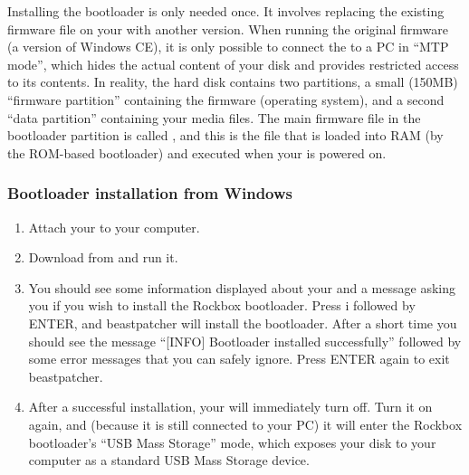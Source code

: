 

Installing the bootloader is only needed once. It involves replacing the
existing firmware file on your \dap{} with another version.
When running the original \playerman{} firmware (a version of Windows CE), it is
only possible to connect the \dap{} to a PC in ``MTP mode'', which hides
the actual content of your \daps{} disk and provides restricted access
to its contents.
In reality, the \daps{} hard disk contains two partitions, a small
(150MB) ``firmware partition'' containing the \daps{} firmware (operating
system), and a second ``data partition'' containing your media files. The main
firmware file in the bootloader partition is called , and
this is the file that is loaded into RAM (by the \daps{} ROM-based
bootloader) and executed when your \dap{} is powered on.

\subsubsection{Bootloader installation from Windows}

\begin{enumerate}

\item Attach your \dap{} to your computer.

\item Download  from
and run it.

\item You should see some information displayed about
your \dap{} and a message asking you if you wish to install the Rockbox
bootloader. Press i followed by ENTER, and beastpatcher will
install the bootloader. After a short time you should see the message
``[INFO] Bootloader installed successfully'' followed by some error
messages that you can safely ignore. Press ENTER again to exit
beastpatcher.

\item After a successful installation, your \dap{} will immediately turn off.
Turn it on again, and (because it is still connected to your PC)
it will enter the Rockbox bootloader's
``USB Mass Storage'' mode, which exposes your \daps{} disk to your computer
as a standard USB Mass Storage device.
\end{enumerate}

